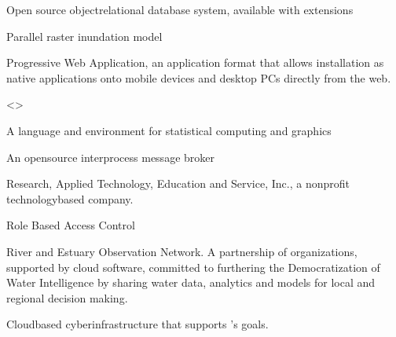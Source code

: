 \documentclass[letterpaper,12pt,english,openany,oneside]{sphinxmanual}
\begin{document}
\begin{description}
\sphinxAtStartPar
Open source object\sphinxhyphen{}relational database system, available with {\hyperref[\detokenize{glossary:term-PostGIS}]{}} extensions

\sphinxAtStartPar
Parallel raster inundation model

\sphinxAtStartPar
Progressive Web Application, an application format that allows installation as native applications onto mobile devices and desktop PCs directly from the web.

\sphinxAtStartPar
\textless{}\textgreater{}

\sphinxAtStartPar
A language and environment for statistical computing and graphics

\sphinxAtStartPar
An open\sphinxhyphen{}source inter\sphinxhyphen{}process message broker

\sphinxAtStartPar
Research, Applied Technology, Education and Service, Inc., a non\sphinxhyphen{}profit technology\sphinxhyphen{}based company.

\sphinxAtStartPar
Role Based Access Control

\sphinxAtStartPar
River and Estuary Observation Network. A partnership of organizations, supported by cloud software, committed to furthering the Democratization of Water Intelligence by sharing water data, analytics and models for local and regional decision making.

\sphinxAtStartPar
Cloud\sphinxhyphen{}based cyber\sphinxhyphen{}infrastructure that supports {\hyperref[\detokenize{glossary:term-REON}]{}}’s goals.


\end{description}
\end{document}
